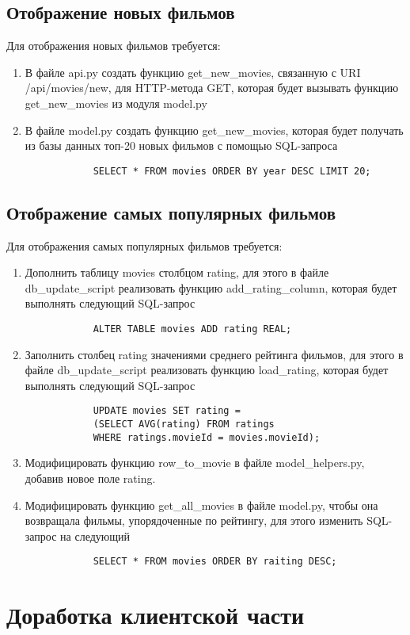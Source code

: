 \documentclass[a4paper,12pt]{report} %
\begin{document}
    \subsection{Отображение новых фильмов}
    Для отображения новых фильмов требуется:
    \begin{enumerate}
    	\item В файле api.py создать функцию get\_new\_movies,  связанную с URI /api/movies/new, для HTTP-метода GET, которая будет вызывать функцию get\_new\_movies из модуля model.py
    	\item В файле model.py создать функцию get\_new\_movies, которая будет получать из базы данных топ-20 новых фильмов с помощью SQL-запроса
    	\begin{verbatim}
    	    SELECT * FROM movies ORDER BY year DESC LIMIT 20;
    	\end{verbatim}
    \end{enumerate}
    \subsection{Отображение самых популярных фильмов}
    Для отображения самых популярных фильмов требуется:
    \begin{enumerate}
    	\item Дополнить таблицу movies столбцом rating, для этого в файле db\_update\_script реализовать функцию add\_rating\_column, которая будет выполнять следующий SQL-запрос 
    	\begin{verbatim}
    		ALTER TABLE movies ADD rating REAL;
    	\end{verbatim}
        \item Заполнить столбец rating значениями среднего рейтинга фильмов, для этого в файле db\_update\_script реализовать функцию load\_rating, которая будет выполнять следующий SQL-запрос
        \begin{verbatim}
        	UPDATE movies SET rating = 
        	(SELECT AVG(rating) FROM ratings
        	WHERE ratings.movieId = movies.movieId);
        \end{verbatim}
        \item Модифицировать функцию row\_to\_movie в файле model\_helpers.py, добавив новое поле rating.
    	\item Модифицировать функцию get\_all\_movies в файле model.py, чтобы она возвращала фильмы, упорядоченные по рейтингу, для этого изменить SQL-запрос на следующий
    	\begin{verbatim}
    		SELECT * FROM movies ORDER BY raiting DESC;
    	\end{verbatim}
    \end{enumerate}
    
    \section{Доработка клиентской части}
    
    
	
\end{document}
